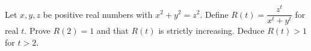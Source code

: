 Let $x,y,z$ be positive real numbers with $x^2+y^2=z^2$. Define $R(t)=\dfrac{z^t}{x^t+y^t}$ for real $t$. Prove $R(2)=1$ and that $R(t)$ is strictly increasing. Deduce $R(t)>1$ for $t>2$.
